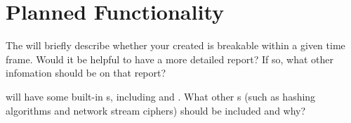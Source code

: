 \section{Planned Functionality}

\begin{question}
The \cry{} \cf{} will briefly describe whether your created
\ca{} is breakable within a given time frame.
Would it be helpful to have a more detailed report?
If so, what other infomation should be on that report?
\end{question}

\begin{question}
\cry{} will have some built-in \ca s,
including \rsa{} and \dh.
What other \ca s
(such as hashing algorithms and network stream ciphers)
should be included and why?
\end{question}
